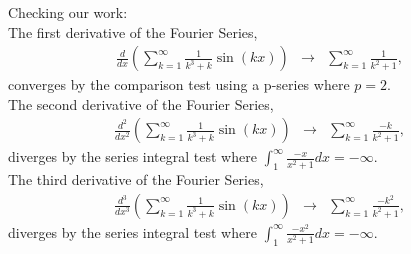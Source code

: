 \documentclass{article}
\newcommand{\bea}{\begin{eqnarray*}}
\newcommand{\eea}{\end{eqnarray*}}
\begin{document}
Checking our work:\\
The first derivative of the Fourier Series,
\bea
\frac{d}{dx}\left(\sum_{k=1}^{\infty}{\frac{1}{k^3+k}\sin(kx)}\right) &\rightarrow& \sum_{k = 1}^{\infty}\frac{1}{k^2+1},
\eea
converges by the comparison test using a p-series where $p=2$.\\
The second derivative of the Fourier Series,
\bea
\frac{d^2}{dx^2}\left(\sum_{k=1}^{\infty}{\frac{1}{k^3+k}\sin(kx)}\right) &\rightarrow& \sum_{k = 1}^{\infty}{\frac{-k}{k^2+1}},
\eea
diverges by the series integral test where $\int_{1}^{\infty}{\frac{-x}{x^2+1}dx} = -\infty$.\\
The third derivative of the Fourier Series,
\bea
\frac{d^3}{dx^3}\left(\sum_{k=1}^{\infty}{\frac{1}{k^3+k}\sin(kx)}\right) &\rightarrow& \sum_{k = 1}^{\infty}\frac{-k^2}{k^2+1},
\eea
diverges by the series integral test where $\int_{1}^{\infty}{\frac{-x^2}{x^2+1}dx} = -\infty$.\\
\end{document}
